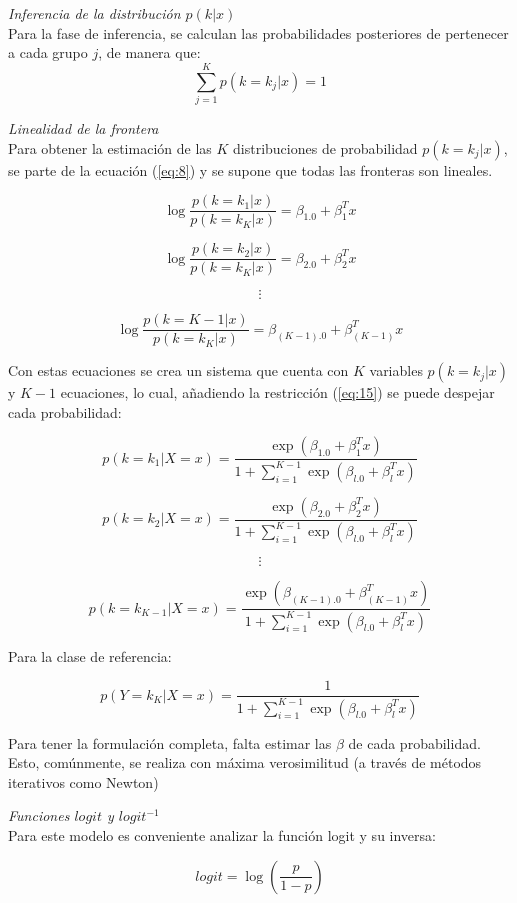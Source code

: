 \textit{Inferencia de la distribución $p(k | x)$} \\
Para la fase de inferencia, se calculan las probabilidades posteriores de pertenecer a cada grupo $j$, de manera que: 
\begin{equation} \label{eq:15}
	\sum\limits_{j = 1}^{K} p(k = k_j | x) = 1
\end{equation}


\textit{Linealidad de la frontera}\\
Para obtener la estimación de las $K$ distribuciones de probabilidad $p(k = k_j | x)$, se parte de la ecuación (\ref{eq:8}) y se supone que todas las fronteras son lineales.

$$ \log \frac{p(k = k_1 | x)}{p(k = k_K | x)} = \beta_{1.0} + \beta_1^T x$$

$$ \log \frac{p(k = k_2 | x)}{p(k = k_K | x)} = \beta_{2.0} + \beta_2^T x$$

$$\vdots$$

$$ \log \frac{p(k = K-1 | x)}{p(k = k_K | x)} = \beta_{(K-1).0} + \beta_{(K-1)}^T x$$

Con estas ecuaciones se crea un sistema que cuenta con $K$ variables $p(k = k_j| x)$ y $K-1$ ecuaciones, lo cual, añadiendo la restricción (\ref{eq:15}) se puede despejar cada probabilidad: 

$$ p(k = k_1 | X = x) = \frac{\exp(\beta_{1.0} + \beta_1^T x)}{1+\sum\limits_{i=1}^{K-1} {\exp(\beta_{l.0} + \beta_l^T x)}} $$

$$ p(k = k_2 | X = x) = \frac{\exp(\beta_{2.0} + \beta_2^T x)}{1+\sum\limits_{i=1}^{K-1} {\exp(\beta_{l.0} + \beta_l^T x)}} $$

$$ \vdots $$

$$ p(k = k_{K-1} | X = x) = \frac{\exp(\beta_{(K-1).0} + \beta_{(K-1)}^T x)}{1+\sum\limits_{i=1}^{K-1} {\exp(\beta_{l.0} + \beta_l^T x)}} $$

Para la clase de referencia: 

$$ p(Y = k_K | X = x) = \frac{1}{1+\sum\limits_{i=1}^{K-1} {\exp(\beta_{l.0} + \beta_l^T x)}} $$

Para tener la formulación completa, falta estimar las $\beta$ de cada probabilidad. Esto, comúnmente, se realiza con máxima verosimilitud (a través de métodos iterativos como Newton) \cite{hastie2009elements}


\textit{Funciones $logit$ y $logit^{-1}$} \\
Para este modelo es conveniente analizar la función logit y su inversa:
 
 \begin{equation} \label{eq:16}
 logit = \log (\frac{p}{1-p}) 
 \end{equation}

